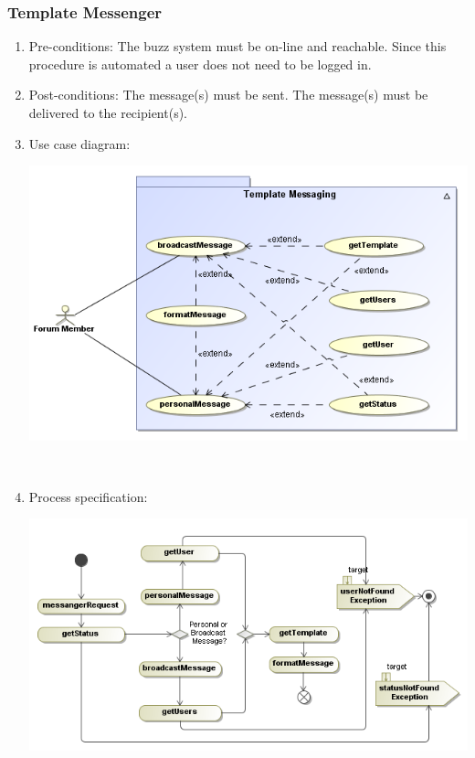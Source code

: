 \documentclass[hidelinks, 12pt, oneside]{article}
\begin{document}
\subsubsection{Template Messenger}
\begin{enumerate}
\item Pre-conditions:   The buzz system must be on-line and reachable. Since this procedure is automated a user does not need to be logged in.
\item Post-conditions:  The message(s) must be sent. The message(s) must be delivered to the recipient(s).

\item Use case diagram:\\
   \centerline{\includegraphics[scale=0.4]{TempleteMessagingUseCases}}\\
   \item Process specification:\\
 \centerline{\includegraphics[scale=0.4]{TemplateMessagingActivities}} 
\end{enumerate}
\end{document}
